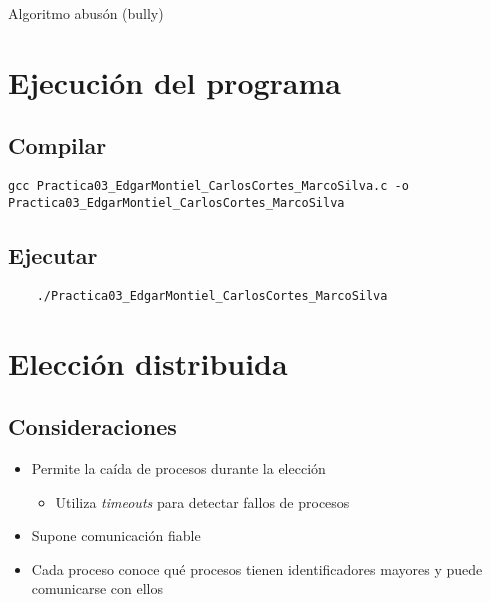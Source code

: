\documentclass[a4paper,12pt]{article}
\begin{document}


\newpage

\begin{center}
    {\huge Algoritmo abusón (bully)}
\end{center}

\section*{Ejecución del programa}

\subsection*{Compilar}

\begin{small}
    \begin{verbatim}
gcc Practica03_EdgarMontiel_CarlosCortes_MarcoSilva.c -o Practica03_EdgarMontiel_CarlosCortes_MarcoSilva
    \end{verbatim}            
\end{small}
\subsection*{Ejecutar}
\begin{verbatim}
    ./Practica03_EdgarMontiel_CarlosCortes_MarcoSilva
\end{verbatim}


\section*{Elección distribuida}

\subsection*{Consideraciones}

\begin{itemize}
    \item Permite la caída de procesos durante la elección
     \begin{itemize}
        \item Utiliza \textit{timeouts} para detectar fallos de procesos
     \end{itemize}
    \item Supone comunicación fiable
    \item Cada proceso conoce qué procesos tienen identificadores mayores y puede comunicarse con ellos
\end{itemize}
\end{document}
